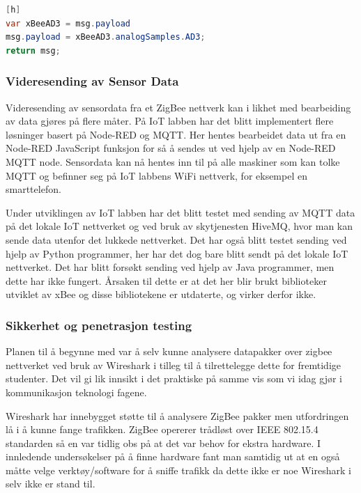 \documentclass{article}
\begin{document}
\begin{lstlisting}[language=Java, caption=Innhenting av luftkvalitet fra xBee modul i Node-RED][h]
var xBeeAD3 = msg.payload
msg.payload = xBeeAD3.analogSamples.AD3;
return msg;
\end{lstlisting}

\subsubsection{Videresending  av Sensor Data}
Videresending av sensordata fra et ZigBee nettverk kan i likhet med bearbeiding av data gjøres på flere måter. På IoT labben har det blitt implementert flere løsninger basert på Node-RED og MQTT. Her hentes bearbeidet data ut fra en Node-RED JavaScript funksjon for så å sendes ut ved hjelp av en Node-RED MQTT node. Sensordata kan nå hentes inn til på alle maskiner som kan tolke MQTT og befinner seg på IoT labbens WiFi nettverk, for eksempel en smarttelefon.

Under utviklingen av IoT labben har det blitt testet med sending av MQTT data på det lokale IoT nettverket og ved bruk av skytjenesten HiveMQ, hvor man kan sende data utenfor det lukkede nettverket. Det har også blitt testet sending ved hjelp av Python programmer, her har det dog bare blitt sendt på det lokale IoT nettverket. Det har blitt forsøkt sending ved hjelp av Java programmer, men dette har ikke fungert. Årsaken til dette er at det her blir brukt biblioteker utviklet av xBee og disse bibliotekene er utdaterte, og virker derfor ikke. 

\newpage
\subsubsection{Sikkerhet og penetrasjon testing}
Planen til å begynne med var å selv kunne analysere datapakker over zigbee nettverket ved bruk av Wireshark i tilleg til å tilrettelegge dette for fremtidige studenter. Det vil gi lik innsikt i det praktiske på samme vis som vi idag gjør i kommunikasjon teknologi fagene.

Wireshark har innebygget støtte til å analysere ZigBee pakker men utfordringen lå i å kunne fange trafikken. ZigBee opererer trådløst over IEEE 802.15.4 standarden så en var tidlig obs på at det var behov for ekstra hardware. I innledende undersøkelser på å finne hardware fant man samtidig ut at en også måtte velge verktøy/software for å sniffe trafikk da dette ikke er noe Wireshark i selv ikke er stand til. 
\end{document}
